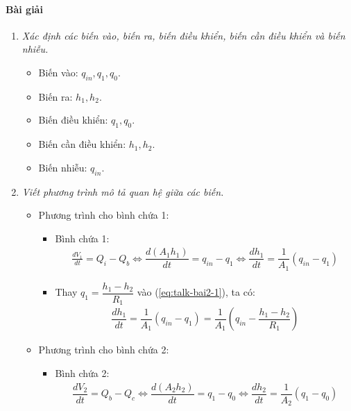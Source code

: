 \documentclass[12pt,a4paper]{article}
\begin{document}
    \paragraph{Bài giải}
        \begin{enumerate}[\it a.]
            \item \textit{Xác định các biến vào, biến ra, biến điều khiển, biến cần điều khiển và biến nhiễu.}
                \begin{itemize}
                    \item Biến vào: $q_{in}, q_1, q_0$.
                    \item Biến ra: $h_1, h_2$.
                    \item Biến điều khiển: $q_1, q_0$.
                    \item Biến cần điều khiển: $h_1, h_2$.
                    \item Biến nhiễu: $q_{in}$.
                \end{itemize}

            \item \textit{Viết phương trình mô tả quan hệ giữa các biến.}
                \begin{itemize}
                    \item Phương trình cho bình chứa 1:
                        \begin{itemize}
                            \item Bình chứa 1:
                                \begin{align} \label{eq:talk-bai2-1}
                                    \frac{dV_1}{dt} = Q_i - Q_b \Longleftrightarrow \dfrac{d \left({A_1 h_1}\right)}{dt} = q_{in} - q_1 \Longleftrightarrow \dfrac{d h_1}{dt} = \dfrac{1}{A_1} \left({q_{in} - q_1}\right)
                                \end{align}

                            \item Thay $q_1 = \dfrac{h_1 - h_2}{R_1}$ vào (\ref{eq:talk-bai2-1}), ta có:
                                \begin{align} \label{eq:talk-bai2-1-2}
                                    \dfrac{d h_1}{dt} = \dfrac{1}{A_1} \left({q_{in} - q_1}\right) = \dfrac{1}{A_1} \left({q_{in} - \dfrac{h_1 - h_2}{R_1}}\right)
                                \end{align}
                        \end{itemize}

                    \item Phương trình cho bình chứa 2:
                        \begin{itemize}
                            \item Bình chứa 2:
                                \begin{align} \label{eq:talk-bai2-2}
                                    \dfrac{dV_2}{dt} = Q_b - Q_c \Longleftrightarrow \dfrac{d \left({A_2 h_2}\right)}{dt} = q_1 - q_0 \Longleftrightarrow \dfrac{d h_2}{dt} = \dfrac{1}{A_2} \left({q_1 - q_0}\right)
                                \end{align}


\end{itemize}
\end{itemize}
\end{enumerate}
\end{document}
